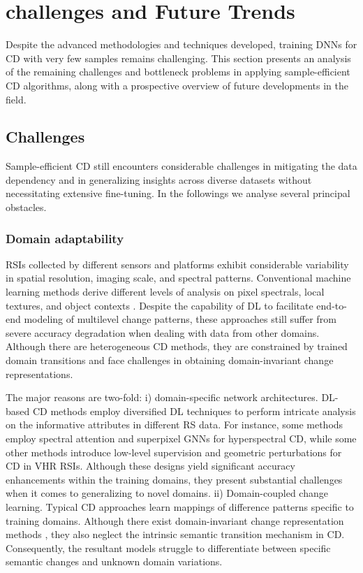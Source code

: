
\section{challenges and Future Trends}\label{sec_future}
Despite the advanced methodologies and techniques developed, training DNNs for CD with very few samples remains challenging. This section presents an analysis of the remaining challenges and bottleneck problems in applying sample-efficient CD algorithms, along with a prospective overview of future developments in the field.

\subsection{Challenges}

Sample-efficient CD still encounters considerable challenges in mitigating the data dependency and in generalizing insights across diverse datasets without necessitating extensive fine-tuning. In the followings we analyse several principal obstacles.

\subsubsection{Domain adaptability}

RSIs collected by different sensors and platforms exhibit considerable variability in spatial resolution, imaging scale, and spectral patterns. Conventional machine learning methods derive different levels of analysis on pixel spectrals, local textures, and object contexts \cite{wen2021change, lv2022land}. Despite the capability of DL to facilitate end-to-end modeling of multilevel change patterns, these approaches still suffer from severe accuracy degradation when dealing with data from other domains. Although there are heterogeneous CD methods, they are constrained by trained domain transitions and face challenges in obtaining domain-invariant change representations.

The major reasons are two-fold:
i) domain-specific network architectures. DL-based CD methods employ diversified DL techniques to perform intricate analysis on the informative attributes in different RS data. For instance, some methods employ spectral attention \cite{hu2022hypernet} and superpixel GNNs \cite{qu2023feature} for hyperspectral CD, while some other methods introduce low-level supervision \cite{peng2019end, lu2020weakly} and geometric perturbations \cite{wang2024stcrnet} for CD in VHR RSIs. Although these designs yield significant accuracy enhancements within the training domains, they present substantial challenges when it comes to generalizing to novel domains.
ii) Domain-coupled change learning. Typical CD approaches learn mappings of difference patterns specific to training domains. Although there exist domain-invariant change representation methods \cite{sublime2019automatic}, they also neglect the intrinsic semantic transition mechanism in CD. Consequently, the resultant models struggle to differentiate between specific semantic changes and unknown domain variations.

